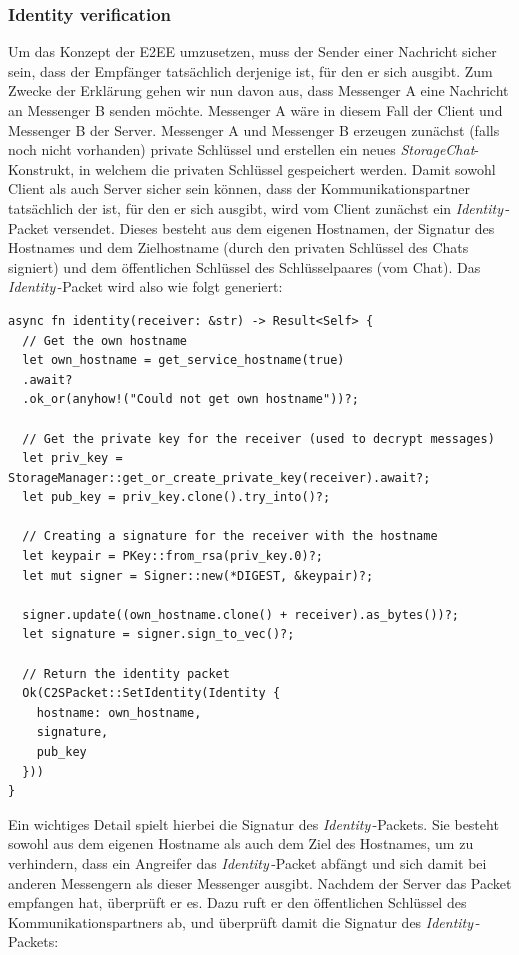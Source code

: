 \documentclass[a4paper,ngerman, headheight=28pt,12pt]{scrartcl}
\newcommand{\identity}{\textit{Identity\,}}
\begin{document}
\subsubsection{Identity verification}
Um das Konzept der E2EE umzusetzen, muss der Sender einer Nachricht sicher sein, dass der Empfänger tatsächlich derjenige ist, für den er sich ausgibt. Zum Zwecke der Erklärung gehen wir nun davon aus, dass Messenger A eine Nachricht an Messenger B senden möchte. Messenger A wäre in diesem Fall der Client und Messenger B der Server.
Messenger A und Messenger B erzeugen zunächst (falls noch nicht vorhanden) private Schlüssel und erstellen ein neues \textit{StorageChat}-Konstrukt, in welchem die privaten Schlüssel gespeichert werden.
Damit sowohl Client als auch Server sicher sein können, dass der Kommunikationspartner tatsächlich der ist, für den er sich ausgibt, wird vom Client zunächst ein \identity-Packet versendet.
Dieses besteht aus dem eigenen Hostnamen, der Signatur des Hostnames und dem Zielhostname (durch den privaten Schlüssel des Chats signiert) und dem öffentlichen Schlüssel des Schlüsselpaares (vom Chat). Das \identity-Packet wird also wie folgt generiert:
\begin{verbatim}
async fn identity(receiver: &str) -> Result<Self> {
  // Get the own hostname
  let own_hostname = get_service_hostname(true)
  .await?
  .ok_or(anyhow!("Could not get own hostname"))?;

  // Get the private key for the receiver (used to decrypt messages)
  let priv_key = StorageManager::get_or_create_private_key(receiver).await?;
  let pub_key = priv_key.clone().try_into()?;

  // Creating a signature for the receiver with the hostname
  let keypair = PKey::from_rsa(priv_key.0)?;
  let mut signer = Signer::new(*DIGEST, &keypair)?;

  signer.update((own_hostname.clone() + receiver).as_bytes())?;
  let signature = signer.sign_to_vec()?;

  // Return the identity packet
  Ok(C2SPacket::SetIdentity(Identity {
    hostname: own_hostname,
    signature,
    pub_key
  }))
}
\end{verbatim}
Ein wichtiges Detail spielt hierbei die Signatur des \identity-Packets. Sie besteht sowohl aus dem eigenen Hostname als auch dem Ziel des Hostnames, um zu verhindern, dass ein Angreifer das \identity-Packet abfängt und sich damit bei anderen Messengern als dieser Messenger ausgibt.
Nachdem der Server das Packet empfangen hat, überprüft er es. Dazu ruft er den öffentlichen Schlüssel des Kommunikationspartners ab, und überprüft damit die Signatur des \identity-Packets:
\end{document}
